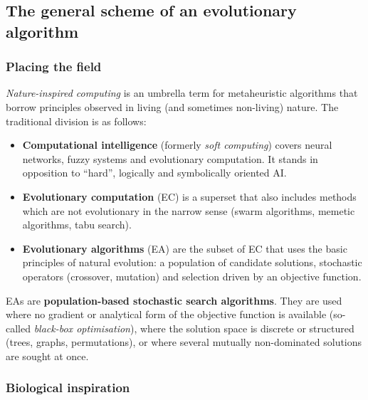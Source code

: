 \documentclass[11pt,a4paper]{article}
\theoremstyle{definition}
\providecommand{\uv}[1]{``#1''}
\begin{document}
\subsection{The general scheme of an evolutionary algorithm}
\label{ssec:obecne}
\subsubsection{Placing the field}

\emph{Nature-inspired computing} is an umbrella term for metaheuristic algorithms
that borrow principles observed in living (and sometimes non-living) nature.
The traditional division is as follows:

\begin{itemize}
\item \textbf{Computational intelligence} (formerly \emph{soft computing}) covers
  neural networks, fuzzy systems and evolutionary computation. It stands in
  opposition to \uv{hard}, logically and symbolically oriented AI.
\item \textbf{Evolutionary computation} (EC) is a superset that also includes
  methods which are not evolutionary in the narrow sense (swarm algorithms,
  memetic algorithms, tabu search).
\item \textbf{Evolutionary algorithms} (EA) are the subset of EC that uses the
  basic principles of natural evolution: a population of candidate solutions,
  stochastic operators (crossover, mutation) and selection driven by an
  objective function.
\end{itemize}

EAs are \textbf{population-based stochastic search algorithms}. They are used
where no gradient or analytical form of the objective function is available
(so-called \emph{black-box optimisation}), where the solution space is discrete
or structured (trees, graphs, permutations), or where several mutually
non-dominated solutions are sought at once.

\subsubsection{Biological inspiration}
\end{document}
